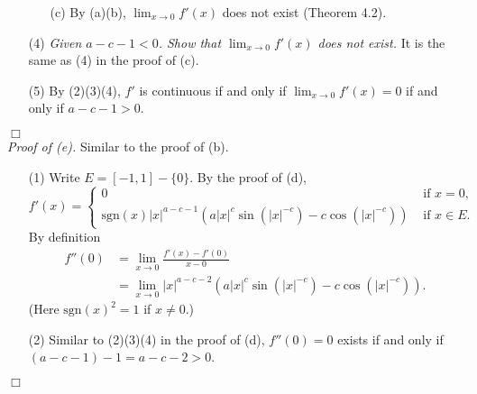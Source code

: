 \documentclass{article}
\begin{document}
\begin{enumerate}
\begin{enumerate}
    \item[(c)]
    By (a)(b), $\lim_{x \to 0} f'(x)$
    does not exist (Theorem 4.2).
  \end{enumerate}

  \item[(4)]
  \emph{Given $a-c-1 < 0$.
  Show that $\lim_{x \to 0} f'(x)$ does not exist.}
  It is the same as (4) in the proof of (c).

  \item[(5)]
  By (2)(3)(4),
  $f'$ is continuous if and only if
  $\lim_{x \to 0} f'(x) = 0$ if and only if
  $a-c-1 > 0$.
\end{enumerate}
$\Box$ \\



\emph{Proof of (e).}
Similar to the proof of (b).
\begin{enumerate}
  \item[(1)]
  Write $E = [-1,1] - \{0\}$.
  By the proof of (d),
  \begin{equation*}
  f'(x) =
    \begin{cases}
      0
        & \text{ if } x = 0, \\
      \mathrm{sgn}(x) |x|^{a-c-1} \left( a|x|^{c}\sin(|x|^{-c}) - c\cos(|x|^{-c}) \right)
        & \text{ if } x \in E.
    \end{cases}
  \end{equation*}
  By definition
  \begin{align*}
    f''(0)
    &= \lim_{x \to 0} \frac{f'(x) - f'(0)}{x - 0} \\
    &= \lim_{x \to 0} |x|^{a-c-2} \left( a|x|^{c}\sin(|x|^{-c}) - c\cos(|x|^{-c}) \right).
  \end{align*}
  (Here $\mathrm{sgn}(x)^2 = 1$ if $x \neq 0$.)

  \item[(2)]
  Similar to (2)(3)(4) in the proof of (d),
  $f''(0) = 0$ exists if and only if $(a-c-1) - 1 = a-c-2 > 0$.
\end{enumerate}
$\Box$ \\
\end{document}
